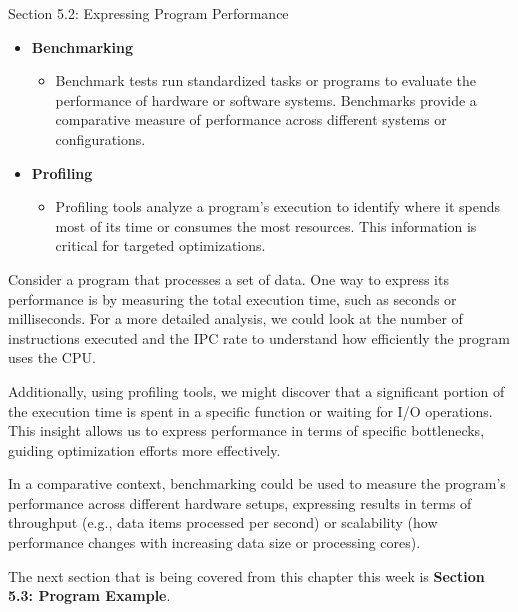 \begin{notes}{Section 5.2: Expressing Program Performance}
\begin{itemize}
        \item \textbf{Benchmarking}
        \begin{itemize}
            \item Benchmark tests run standardized tasks or programs to evaluate the performance of hardware or software systems. Benchmarks provide a comparative measure of performance across different 
            systems or configurations.
        \end{itemize}
        \item \textbf{Profiling}
        \begin{itemize}
            \item Profiling tools analyze a program's execution to identify where it spends most of its time or consumes the most resources. This information is critical for targeted optimizations.
        \end{itemize}
    \end{itemize}
    
    \begin{highlight}
        Consider a program that processes a set of data. One way to express its performance is by measuring the total execution time, such as seconds or milliseconds. For a more detailed analysis, we 
        could look at the number of instructions executed and the IPC rate to understand how efficiently the program uses the CPU.
    
        Additionally, using profiling tools, we might discover that a significant portion of the execution time is spent in a specific function or waiting for I/O operations. This insight allows us 
        to express performance in terms of specific bottlenecks, guiding optimization efforts more effectively.
    
        In a comparative context, benchmarking could be used to measure the program's performance across different hardware setups, expressing results in terms of throughput (e.g., data items processed 
        per second) or scalability (how performance changes with increasing data size or processing cores).
    \end{highlight}    
\end{notes}

The next section that is being covered from this chapter this week is \textbf{Section 5.3: Program Example}.

